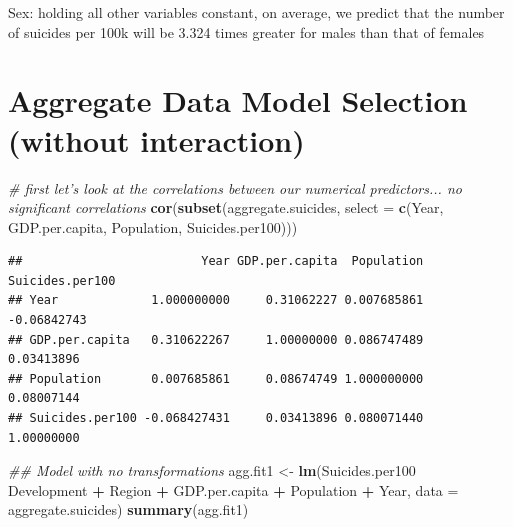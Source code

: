 \documentclass[11pt,]{article}
\newenvironment{Shaded}{\begin{snugshade}}{\end{snugshade}}
\newcommand{\CommentTok}[1]{\textcolor[rgb]{0.56,0.35,0.01}{\textit{#1}}}
\newcommand{\DataTypeTok}[1]{\textcolor[rgb]{0.13,0.29,0.53}{#1}}
\newcommand{\KeywordTok}[1]{\textcolor[rgb]{0.13,0.29,0.53}{\textbf{#1}}}
\newcommand{\NormalTok}[1]{#1}
\newcommand{\OperatorTok}[1]{\textcolor[rgb]{0.81,0.36,0.00}{\textbf{#1}}}
\newcommand{\StringTok}[1]{\textcolor[rgb]{0.31,0.60,0.02}{#1}}
\begin{document}
Sex: holding all other variables constant, on average, we predict that
the number of suicides per 100k will be 3.324 times greater for males
than that of females

\hypertarget{aggregate-data-model-selection-without-interaction}{%
\section{Aggregate Data Model Selection (without
interaction)}\label{aggregate-data-model-selection-without-interaction}}

\begin{Shaded}
\begin{Highlighting}[]
\CommentTok{# first let's look at the correlations between our numerical predictors... no significant correlations}
\KeywordTok{cor}\NormalTok{(}\KeywordTok{subset}\NormalTok{(aggregate.suicides, }\DataTypeTok{select =} \KeywordTok{c}\NormalTok{(Year, GDP.per.capita, Population, Suicides.per100)))}
\end{Highlighting}
\end{Shaded}

\begin{verbatim}
##                         Year GDP.per.capita  Population Suicides.per100
## Year             1.000000000     0.31062227 0.007685861     -0.06842743
## GDP.per.capita   0.310622267     1.00000000 0.086747489      0.03413896
## Population       0.007685861     0.08674749 1.000000000      0.08007144
## Suicides.per100 -0.068427431     0.03413896 0.080071440      1.00000000
\end{verbatim}

\begin{Shaded}
\begin{Highlighting}[]
\CommentTok{## Model with no transformations}
\NormalTok{agg.fit1 <-}\StringTok{ }\KeywordTok{lm}\NormalTok{(Suicides.per100 }\OperatorTok{~}\StringTok{ }\NormalTok{Development }\OperatorTok{+}\StringTok{ }\NormalTok{Region }\OperatorTok{+}\StringTok{ }\NormalTok{GDP.per.capita }\OperatorTok{+}\StringTok{ }\NormalTok{Population }\OperatorTok{+}\StringTok{ }\NormalTok{Year, }\DataTypeTok{data =}\NormalTok{ aggregate.suicides)}
\KeywordTok{summary}\NormalTok{(agg.fit1)}
\end{Highlighting}
\end{Shaded}
\end{document}
